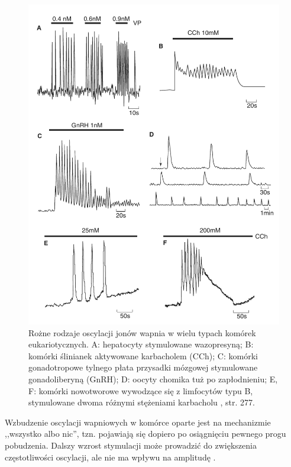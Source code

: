 \begin{figure}
\centering
\includegraphics[width=.99\textwidth]{rysunki/rozdzial_2/differentoscilations.png}
\caption[Rodzaje oscylacji wapniowych]{Rożne rodzaje oscylacji jonów wapnia w wielu typach komórek eukariotycznych. A: hepatocyty stymulowane wazopresyną; B: komórki ślinianek aktywowane karbacholem (CCh); C: komórki gonadotropowe tylnego płata przysadki mózgowej stymulowane gonadoliberyną (GnRH); D: oocyty chomika tuż po zapłodnieniu; E, F: komórki nowotworowe wywodzące się z limfocytów typu B, stymulowane dwoma różnymi stężeniami karbacholu \cite{Keener2009}, str. 277.}
\label{fig:oscylacje}
\end{figure}


Wzbudzenie oscylacji wapniowych w komórce oparte jest na mechanizmie ,,wszystko albo nic'', tzn. pojawiają się dopiero po osiągnięciu pewnego progu pobudzenia. Dalszy wzrost stymulacji może prowadzić do zwiększenia częstotliwości oscylacji, ale nie ma wpływu na amplitudę \cite{Keener2009}.

